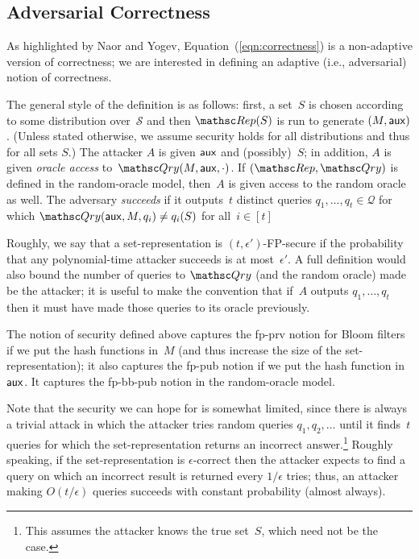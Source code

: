 \subsection{Adversarial Correctness}
As highlighted by Naor and Yogev,
Equation~(\ref{eqn:correctness}) is a non-adaptive version of correctness;
we are interested in defining an adaptive (i.e., adversarial) notion
of correctness. 

The general style of the definition is as follows:
first, a set~$S$ is chosen according to some distribution over~$\mathcal{S}$ and then
$\Rep(S)$ is run to generate $(M,{\sf aux})$. (Unless stated otherwise, we assume
security holds for all distributions and thus for all sets $S$.)
The attacker $A$ is given ${\sf aux}$ and (possibly)~$S$;
in addition, $A$ is given \emph{oracle access} to~$\Qry(M,\aux,\cdot)$.
If $(\Rep, \Qry)$ is defined in the random-oracle model, then~$A$ is given access to the random oracle as well.
The adversary \emph{succeeds} if it outputs~$t$ distinct queries $q_1, \ldots, q_t \in \mathcal{Q}$ for which
$\Qry(\aux, M, q_i) \neq q_i(S)$ for all~$i \in [t]$

Roughly, we say that a set-representation is $(t,\epsilon')$-FP-secure if the probability that
any polynomial-time attacker succeeds is at most~$\epsilon'$. 
A full definition would also bound the number of queries to $\Qry$ (and the random oracle) made
be the attacker; it is useful to make the convention that if~$A$ outputs
$q_1, \ldots, q_t$ then it must have made those queries to its oracle previously.

The notion of security defined above captures the fp-prv notion for Bloom filters
if we put the hash functions in~$M$ (and thus increase the size of the set-representation); it also captures the fp-pub
notion if we put the hash function in~${\sf aux}$. 
It captures the fp-bb-pub notion in the random-oracle model.

Note that the security we can hope for is somewhat limited, since there
is always a trivial attack in which
the attacker tries random queries $q_1, q_2, \ldots$ until it finds~$t$ queries for which the
set-representation returns an incorrect answer.\footnote{This assumes the attacker
knows the true set~$S$, which need not be the case.} Roughly speaking,
if the set-representation is $\epsilon$-correct then the attacker expects to find a query on which
an incorrect result is returned every $1/\epsilon$ tries; thus, an
attacker making $O(t/\epsilon)$ queries succeeds with constant probability (almost always).

